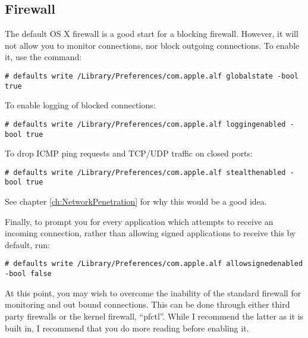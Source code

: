 		\subsection{Firewall}
			The default OS X firewall is a good start for a blocking firewall.
			However, it will not allow you to monitor connections, nor block outgoing connections.
			To enable it, use the command:
			\begin{lstlisting}[style=CLI]
				# defaults write /Library/Preferences/com.apple.alf globalstate -bool true
			\end{lstlisting}
			To enable logging of blocked connections:
			\begin{lstlisting}[style=CLI]
				# defaults write /Library/Preferences/com.apple.alf loggingenabled -bool true
			\end{lstlisting}
			To drop ICMP ping requests and TCP/UDP traffic on closed ports:
			\begin{lstlisting}[style=CLI]
				# defaults write /Library/Preferences/com.apple.alf stealthenabled -bool true
			\end{lstlisting}
			See chapter \ref{ch:NetworkPenetration} for why this would be a good idea.

			Finally, to prompt you for every application which attempts to receive an incoming connection, rather than allowing signed applications to receive this by default, run:
			\begin{lstlisting}[style=CLI]
				# defaults write /Library/Preferences/com.apple.alf allowsignedenabled -bool false
			\end{lstlisting}

			At this point, you may wish to overcome the inability of the standard firewall for monitoring and out bound connections.
			This can be done through either third party firewalls or the kernel firewall, ``pfctl''.
			While I recommend the latter as it is built in, I recommend that you do more reading before enabling it.

